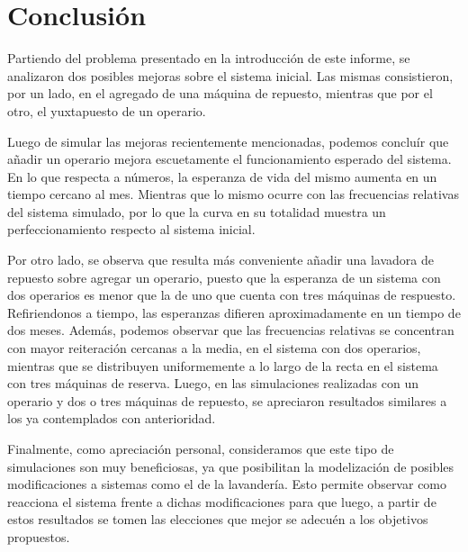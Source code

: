 \section{Conclusión}

  \par Partiendo del problema presentado en la introducción de este informe, se analizaron dos posibles mejoras sobre
  el sistema inicial. Las mismas consistieron, por un lado, en el agregado de una máquina de repuesto, mientras que por
  el otro, el yuxtapuesto de un operario.

  \par Luego de simular las mejoras recientemente mencionadas, podemos concluír que añadir un operario mejora
  escuetamente el funcionamiento esperado del sistema. En lo que respecta a números, la esperanza de vida del mismo
  aumenta en un tiempo cercano al mes. Mientras que lo mismo ocurre con las frecuencias relativas del sistema simulado,
  por lo que la curva en su totalidad muestra un perfeccionamiento respecto al sistema inicial.

  \par Por otro lado, se observa que resulta más conveniente añadir una lavadora de repuesto sobre agregar un operario,
  puesto que la esperanza de un sistema con dos operarios es menor que la de uno que cuenta con tres máquinas de
  respuesto. Refiriendonos a tiempo, las esperanzas difieren aproximadamente en un tiempo de dos meses. Además, podemos
  observar que las frecuencias relativas se concentran con mayor reiteración cercanas a la media, en el sistema con dos
  operarios, mientras que se distribuyen uniformemente a lo largo de la recta en el sistema con tres máquinas de
  reserva. Luego, en las simulaciones realizadas con un operario y dos o tres máquinas de repuesto, se apreciaron
  resultados similares a los ya contemplados con anterioridad.

  \par Finalmente, como apreciación personal, consideramos que este tipo de simulaciones son muy beneficiosas, ya que
  posibilitan la modelización de posibles modificaciones a sistemas como el de la lavandería. Esto permite observar
  como reacciona el sistema frente a dichas modificaciones para que luego, a partir de estos resultados se tomen las
  elecciones que mejor se adecuén a los objetivos propuestos.
